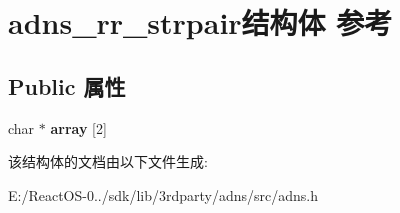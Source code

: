 \hypertarget{structadns__rr__strpair}{}\section{adns\+\_\+rr\+\_\+strpair结构体 参考}
\label{structadns__rr__strpair}
\subsection*{Public 属性}
\begin{DoxyCompactItemize}
\item 
\mbox{\label{structadns__rr__strpair_a3fec6f4eebc97f4cc5c187960f3791e8}} 
char $\ast$ {\bfseries array} \mbox{[}2\mbox{]}
\end{DoxyCompactItemize}


该结构体的文档由以下文件生成\+:\begin{DoxyCompactItemize}
\item 
E\+:/\+React\+O\+S-\/0../sdk/lib/3rdparty/adns/src/adns.\+h\end{DoxyCompactItemize}
